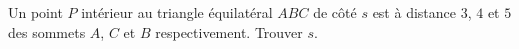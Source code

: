 Un point $P$ intérieur au triangle équilatéral $ABC$ de côté $s$ est à distance $3$, $4$ et $5$ des sommets $A$, $C$ et $B$ respectivement. Trouver $s$.
